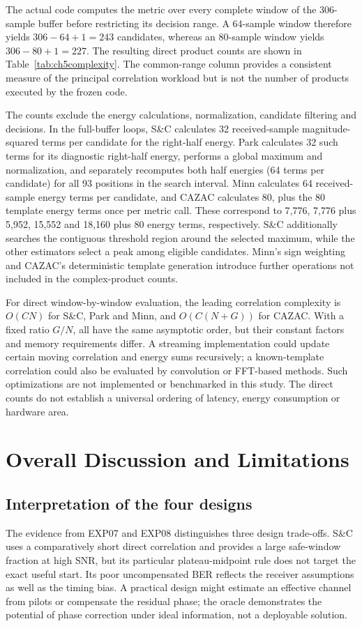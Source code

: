 The actual code computes the metric over every complete window of the 306-sample buffer before restricting its decision range. A 64-sample window therefore yields $306-64+1=243$ candidates, whereas an 80-sample window yields $306-80+1=227$. The resulting direct product counts are shown in Table~\ref{tab:ch5complexity}. The common-range column provides a consistent measure of the principal correlation workload but is not the number of products executed by the frozen code.

The counts exclude the energy calculations, normalization, candidate filtering and decisions. In the full-buffer loops, S\&C calculates 32 received-sample magnitude-squared terms per candidate for the right-half energy. Park calculates 32 such terms for its diagnostic right-half energy, performs a global maximum and normalization, and separately recomputes both half energies (64 terms per candidate) for all 93 positions in the search interval. Minn calculates 64 received-sample energy terms per candidate, and CAZAC calculates 80, plus the 80 template energy terms once per metric call. These correspond to 7,776, 7,776 plus 5,952, 15,552 and 18,160 plus 80 energy terms, respectively. S\&C additionally searches the contiguous threshold region around the selected maximum, while the other estimators select a peak among eligible candidates. Minn's sign weighting and CAZAC's deterministic template generation introduce further operations not included in the complex-product counts.

For direct window-by-window evaluation, the leading correlation complexity is $O(CN)$ for S\&C, Park and Minn, and $O(C(N+G))$ for CAZAC. With a fixed ratio $G/N$, all have the same asymptotic order, but their constant factors and memory requirements differ. A streaming implementation could update certain moving correlation and energy sums recursively; a known-template correlation could also be evaluated by convolution or FFT-based methods. Such optimizations are not implemented or benchmarked in this study. The direct counts do not establish a universal ordering of latency, energy consumption or hardware area.

\section[Overall Discussion]{Overall Discussion and Limitations}
\subsection{Interpretation of the four designs}
The evidence from EXP07 and EXP08 distinguishes three design trade-offs. S\&C uses a comparatively short direct correlation and provides a large safe-window fraction at high SNR, but its particular plateau-midpoint rule does not target the exact useful start. Its poor uncompensated BER reflects the receiver assumptions as well as the timing bias. A practical design might estimate an effective channel from pilots or compensate the residual phase; the oracle demonstrates the potential of phase correction under ideal information, not a deployable solution.

